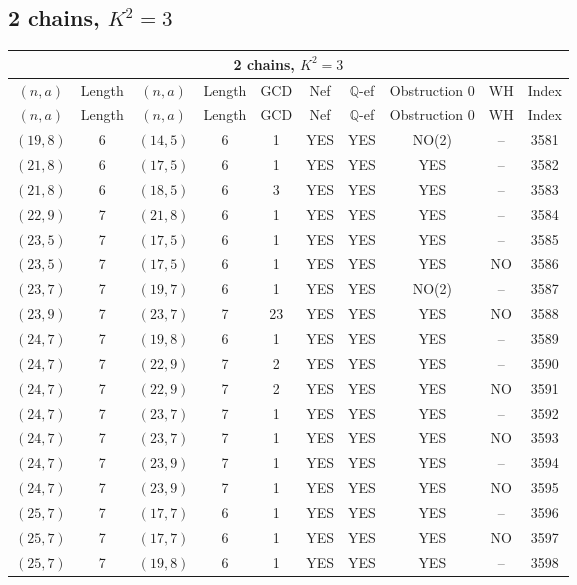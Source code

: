 \subsection{2 chains, $K^2 = 3$}
\begin{longtable}{|c|c|c|c|c|c|c|c|c|c|}
\hline
\multicolumn{10}{|c|}{2 chains, $K^2 = 3$}\\
\hline
$(n,a)$ & Length & $(n,a)$ & Length & GCD & Nef & $\mathbb Q$-ef & Obstruction 0 & WH & Index\\
\hline
\endfirsthead

\hline
$(n,a)$ & Length & $(n,a)$ & Length & GCD & Nef & $\mathbb Q$-ef & Obstruction 0 & WH & Index\\
\hline
\endhead
\hline
\endfoot

$(19, 8)$ & 6 & $(14, 5)$ & 6 & 1 & YES & YES & NO(2) & -- & 3581\\
$(21, 8)$ & 6 & $(17, 5)$ & 6 & 1 & YES & YES & YES & -- & 3582\\
$(21, 8)$ & 6 & $(18, 5)$ & 6 & 3 & YES & YES & YES & -- & 3583\\
$(22, 9)$ & 7 & $(21, 8)$ & 6 & 1 & YES & YES & YES & -- & 3584\\
$(23, 5)$ & 7 & $(17, 5)$ & 6 & 1 & YES & YES & YES & -- & 3585\\
$(23, 5)$ & 7 & $(17, 5)$ & 6 & 1 & YES & YES & YES & NO & 3586\\
$(23, 7)$ & 7 & $(19, 7)$ & 6 & 1 & YES & YES & NO(2) & -- & 3587\\
$(23, 9)$ & 7 & $(23, 7)$ & 7 & 23 & YES & YES & YES & NO & 3588\\
$(24, 7)$ & 7 & $(19, 8)$ & 6 & 1 & YES & YES & YES & -- & 3589\\
$(24, 7)$ & 7 & $(22, 9)$ & 7 & 2 & YES & YES & YES & -- & 3590\\
$(24, 7)$ & 7 & $(22, 9)$ & 7 & 2 & YES & YES & YES & NO & 3591\\
$(24, 7)$ & 7 & $(23, 7)$ & 7 & 1 & YES & YES & YES & -- & 3592\\
$(24, 7)$ & 7 & $(23, 7)$ & 7 & 1 & YES & YES & YES & NO & 3593\\
$(24, 7)$ & 7 & $(23, 9)$ & 7 & 1 & YES & YES & YES & -- & 3594\\
$(24, 7)$ & 7 & $(23, 9)$ & 7 & 1 & YES & YES & YES & NO & 3595\\
$(25, 7)$ & 7 & $(17, 7)$ & 6 & 1 & YES & YES & YES & -- & 3596\\
$(25, 7)$ & 7 & $(17, 7)$ & 6 & 1 & YES & YES & YES & NO & 3597\\
$(25, 7)$ & 7 & $(19, 8)$ & 6 & 1 & YES & YES & YES & -- & 3598\\

\end{longtable}
